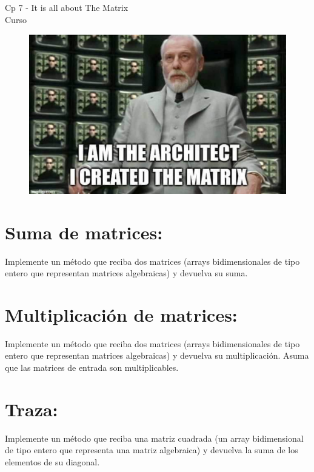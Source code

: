 \begin{center}
    \begin{large}
    Cp 7 - It is all about The Matrix\\
    Curso \academicyear\\
    \end{large}
    \begin{figure}[h]
    	\centering
    	\includegraphics[width=0.5\linewidth]{cp7/matrix.png}
    \end{figure}
\end{center}

% 

% 

\section{Suma de matrices:}  
Implemente un método que reciba dos matrices (arrays bidimensionales de tipo entero que representan matrices algebraicas) y devuelva su suma.

\section{Multiplicación de matrices:}  
Implemente un método que reciba dos matrices (arrays bidimensionales de tipo entero que representan matrices algebraicas) y devuelva su multiplicación. Asuma que las matrices de entrada son multiplicables.

\section{Traza:}  
Implemente un método que reciba una matriz cuadrada (un array bidimensional de tipo entero que representa una matriz algebraica) y devuelva la suma de los elementos de su diagonal.

